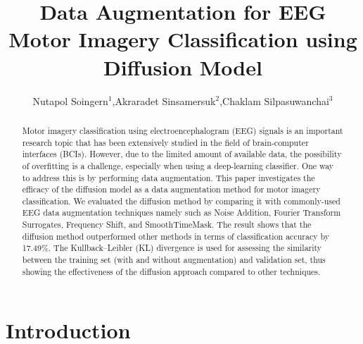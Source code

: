 \documentclass[12pt]{iopart}
\begin{document}
%
\title{Data Augmentation for EEG Motor Imagery Classification using Diffusion Model}
%
%
\author{Nutapol Soingern$^1$,Akraradet Sinsamersuk$^2$,Chaklam Silpasuwanchai$^3$}
%
%
\address{}

%
%
\begin{abstract}
  Motor imagery classification using electroencephalogram (EEG) signals is an important research topic that has been extensively studied in the field of brain-computer interfaces (BCIs). However, due to the limited amount of available data, the possibility of overfitting is a challenge, especially when using a deep-learning classifier. One way to address this is by performing data augmentation. This paper investigates the efficacy of the diffusion model as a data augmentation method for motor imagery classification. We evaluated the diffusion method by comparing it with commonly-used EEG data augmentation techniques namely such as Noise Addition,
  Fourier Transform Surrogates, Frequency Shift, and SmoothTimeMask. The result shows that the diffusion method outperformed other methods in terms of classification accuracy by 17.49\%. The Kullback–Leibler (KL) divergence is used for assessing the similarity between the training set (with and without augmentation) and validation set, thus showing the effectiveness of the diffusion approach compared to other techniques.

\end{abstract}
%
%
%
\section{Introduction}
\end{document}
